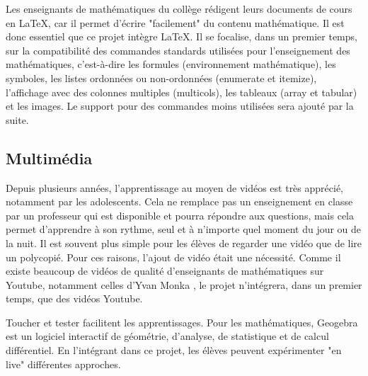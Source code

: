 \documentclass[12pt,titlepage,oneside]{article}
\renewcommand{\footnote}[1]{}
\begin{document}
Les enseignants de mathématiques du collège rédigent leurs documents de cours en LaTeX, car il permet d'écrire "facilement" du contenu mathématique. Il est donc essentiel que ce projet intègre LaTeX. Il se focalise, dans un premier temps, sur la compatibilité des commandes standards utilisées pour l'enseignement des mathématiques, c'est-à-dire les formules (environnement mathématique), les symboles, les listes ordonnées ou non-ordonnées (enumerate et itemize), l'affichage avec des colonnes multiples (multicols), les tableaux (array et tabular) et les images. Le support pour des commandes moins utilisées sera ajouté par la suite.\par

\subsection{Multimédia}
Depuis plusieurs années, l'apprentissage au moyen de vidéos est très apprécié, notamment par les adolescents. Cela ne remplace pas un enseignement en classe par un professeur qui est disponible et pourra répondre aux questions, mais cela permet d'apprendre à son rythme, seul et à n'importe quel moment du jour ou de la nuit. Il est souvent plus simple pour les élèves de regarder une vidéo que de lire un polycopié. Pour ces raisons, l'ajout de vidéo était une nécessité. Comme il existe beaucoup de vidéos de qualité d'enseignants de mathématiques sur Youtube, notamment celles d'Yvan Monka \footnote{\url{https://www.youtube.com/@YMONKA}}, le projet n'intégrera, dans un premier temps, que des vidéos Youtube.\par
Toucher et tester facilitent les apprentissages. Pour les mathématiques, Geogebra est un logiciel interactif de géométrie, d'analyse, de statistique et de calcul différentiel. En l'intégrant dans ce projet, les élèves peuvent expérimenter "en live" différentes approches.\par

\newpage
\end{document}
